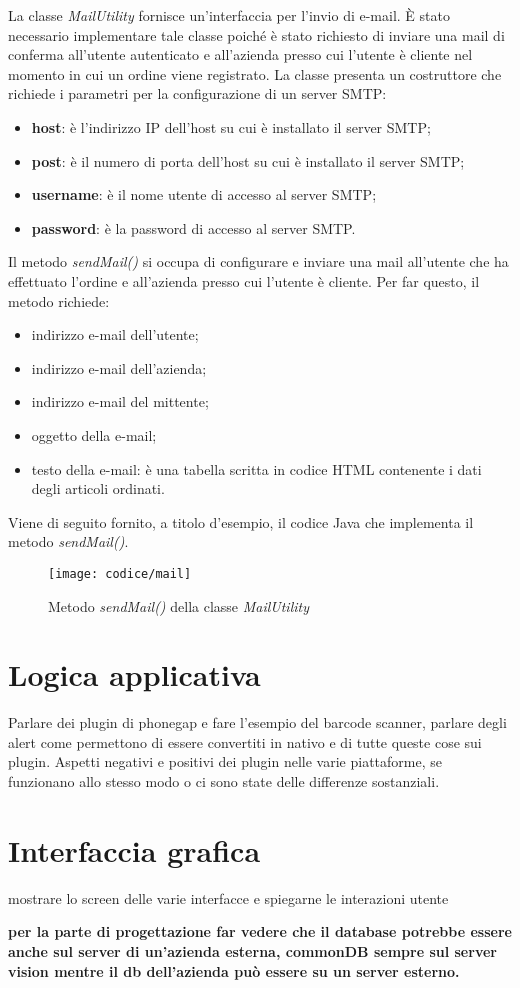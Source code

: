 La classe \textit{MailUtility} fornisce un'interfaccia per l'invio di e-mail. È stato necessario implementare tale classe poiché è stato richiesto di inviare una mail di conferma all'utente autenticato e all'azienda presso cui l'utente è cliente nel momento in cui un ordine viene registrato. La classe presenta un costruttore che richiede i parametri per la configurazione di un server SMTP:
\begin{itemize}
	\item \textbf{host}: è l'indirizzo IP dell'host su cui è installato il server SMTP;
	\item \textbf{post}: è il numero di porta dell'host su cui è installato il server SMTP;
	\item \textbf{username}: è il nome utente di accesso al server SMTP;
	\item \textbf{password}: è la password di accesso al server SMTP.
\end{itemize}
Il metodo \textit{sendMail()} si occupa di configurare e inviare una mail all'utente che ha effettuato l'ordine e all'azienda presso cui l'utente è cliente. Per far questo, il metodo richiede:
\begin{itemize}
	\item indirizzo e-mail dell'utente;
	\item indirizzo e-mail dell'azienda;
	\item indirizzo e-mail del mittente;
	\item oggetto della e-mail;
	\item testo della e-mail: è una tabella scritta in codice HTML contenente i dati degli articoli ordinati.
\end{itemize}
Viene di seguito fornito, a titolo d'esempio, il codice Java che implementa il metodo \textit{sendMail()}.

\begin{figure}[!h] 
    \centering 
    \texttt{[image: codice/mail]} 
    \caption{Metodo \textit{sendMail()} della classe \textit{MailUtility}}
\end{figure}

\section{Logica applicativa}

Parlare dei plugin di phonegap e fare l'esempio del barcode scanner, parlare degli alert come permettono di essere convertiti in nativo e di tutte queste cose sui plugin. Aspetti negativi e positivi dei plugin nelle varie piattaforme, se funzionano allo stesso modo o ci sono state delle differenze sostanziali.

\section{Interfaccia grafica}

mostrare lo screen delle varie interfacce e spiegarne le interazioni utente

\textbf{per la parte di progettazione far vedere che il database potrebbe essere anche sul server di un'azienda esterna, commonDB sempre sul server vision mentre il db dell'azienda può essere su un server esterno.}
